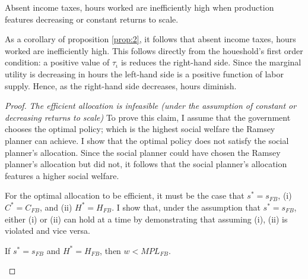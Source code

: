  \begin{corollary}
Absent income taxes, hours worked are inefficiently high when production features decreasing or constant returns to scale. 
 \end{corollary}
 As a corollary of proposition \ref{prop:2}, it follows that absent income taxes, hours worked are inefficiently high. This follows directly from the houeshold's first order condition:  a positive value of $\tau_\iota$ is reduces the right-hand side. Since the marginal utility is decreasing in hours the left-hand side is a positive function of labor supply. Hence, as the right-hand side decreases, hours diminish.   
 
 \begin{proof}\textit{The efficient allocation is infeasible (under the assumption of constant or decreasing returns to scale)}
 	To prove this claim, I assume that the government chooses the optimal policy; which is the highest social welfare the Ramsey planner can achieve. I show that the optimal policy does not satisfy the social planner's allocation. Since the social planner could have chosen the Ramsey planner's allocation  but did not, it follows that the social planner's allocation features a higher social welfare.
 	
For the optimal allocation to be efficient, it must be the case that $s^*=s_{FB}$, (i) $C^*=C_{FB}$, and (ii) $H^*=H_{FB}$. I show that, under the assumption that $s^*=s_{FB}$, either (i) or (ii) can hold at a time by demonstrating that assuming (i), (ii) is violated and vice versa.


\begin{lemma}{If $s^*=s_{FB}$ and $H^*=H_{FB}$, then $w<MPL_{FB}$}.
\end{lemma}

%


\end{proof}
